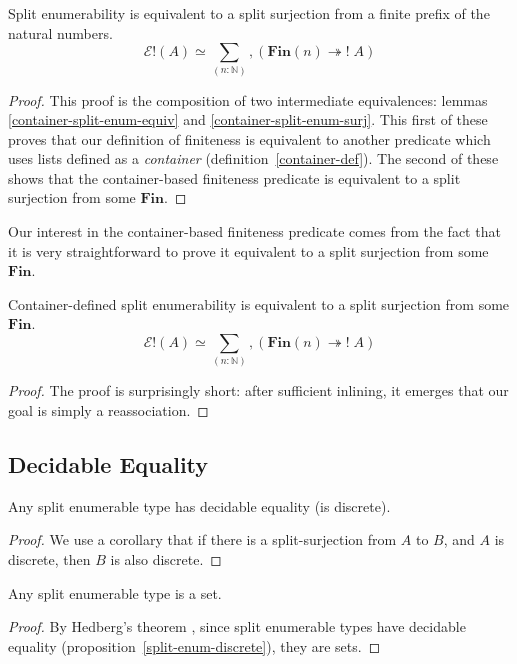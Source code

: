 \begin{theorem} \label{split-enum-surj}
  Split enumerability is equivalent to a split surjection from a finite prefix
  of the natural numbers.
  \begin{equation}
    \mathcal{E}!(A) \simeq \sum_{(n : \mathbb{N})} , \left( \mathbf{Fin}(n) \twoheadrightarrow ! \; A \right)
  \end{equation}
\end{theorem}
\begin{proof}
  This proof is the composition of two intermediate equivalences: lemmas
  \ref{container-split-enum-equiv} and \ref{container-split-enum-surj}.
  This first of these proves that our definition of finiteness is equivalent to
  another predicate which uses lists defined as a \emph{container}
  (definition~\ref{container-def}).
  The second of these shows that the container-based finiteness predicate is
  equivalent to a split surjection from some \(\mathbf{Fin}\).
\end{proof}

Our interest in the container-based finiteness predicate comes from the fact
that it is very straightforward to prove it equivalent to a split surjection
from some \(\mathbf{Fin}\).
\begin{lemma} \label{container-split-enum-surj}
  Container-defined split enumerability is equivalent to a split surjection from
  some \(\mathbf{Fin}\).
  \begin{equation}
    \mathcal{E}!(A) \simeq \sum_{(n : \mathbb{N})} , \left( \mathbf{Fin}(n) \twoheadrightarrow ! \; A \right)
  \end{equation}
\end{lemma}
\begin{proof}
  The proof is surprisingly short: after sufficient inlining, it emerges that
  our goal is simply a reassociation.
\end{proof}
\subsection{Decidable Equality}
\begin{lemma} \label{split-enum-discrete}
  Any split enumerable type has decidable equality (is discrete).
\end{lemma}
\begin{proof}
  We use a corollary that if there is a split-surjection from \(A\) to \(B\),
  and \(A\) is discrete, then \(B\) is also discrete.
\end{proof}
\begin{lemma}
  Any split enumerable type is a set.
\end{lemma}
\begin{proof}
  By Hedberg's theorem \cite{hedbergCoherenceTheoremMartinLof1998}, since split
  enumerable types have decidable equality
  (proposition~\ref{split-enum-discrete}), they are sets.
\end{proof}
